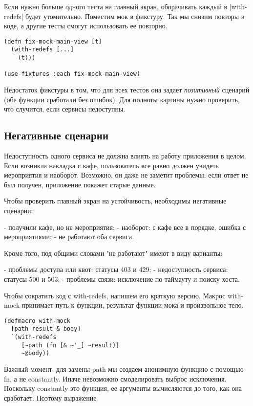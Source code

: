Если нужно больше одного теста на главный экран, оборачивать каждый в
\spverb|with-redefs| будет утомительно. Поместим мок в фикстуру. Так мы снизим
повторы в коде, а другие тесты смогут использовать ее повторно.

\begin{verbatim}
(defn fix-mock-main-view [t]
  (with-redefs [...]
    (t)))

(use-fixtures :each fix-mock-main-view)
\end{verbatim}

Недостаток фикстуры в том, что для всех тестов она задает \emph{позитивный}
сценарий (обе функции сработали без ошибок). Для полноты картины нужно
проверить, что случится, если сервисы недоступны.


\subsection{Негативные сценарии}

Недоступность одного сервиса не должна влиять на работу приложения в целом. Если
возникла накладка с кафе, пользователь все равно должен увидеть мероприятия и
наоборот. Возможно, он даже не заметит проблемы: если ответ не был получен,
приложение покажет старые данные.

Чтобы проверить главный экран на устойчивость, необходимы негативные сценарии:

- получили кафе, но не мероприятия;
- наоборот: с кафе все в порядке, ошибка с мероприятиями;
- не работают оба сервиса.

Кроме того, под общими словами "не работают" имеют в виду варианты:

- проблемы доступа или квот: статусы 403 и 429;
- недоступность сервиса: статусы 500 и 503;
- проблемы связи: исключение по таймауту и поиску хоста.

Чтобы сократить код с with-redefs, напишем его краткую версию. Макрос with-mock
принимает путь к функции, результат функции-мока и произвольное тело.

\begin{verbatim}
(defmacro with-mock
  [path result & body]
  `(with-redefs
     [~path (fn [& ~'_] ~result)]
     ~@body))
\end{verbatim}

Важный момент: для замены path мы создаем анонимную функцию с помощью fn, а не
constantly. Иначе невозможно смоделировать выброс исключения. Поскольку
constantly это функция, ее аргументы вычисляются до того, как она
сработает. Поэтому выражение

